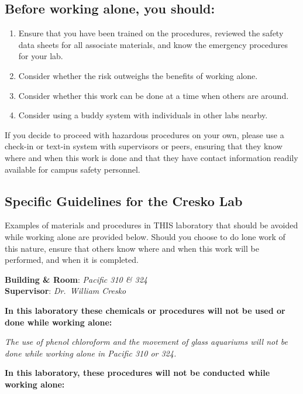 \documentclass[
]{book}
\providecommand{\tightlist}{%
  \setlength{\itemsep}{0pt}\setlength{\parskip}{0pt}}
\begin{document}
\hypertarget{before-working-alone-you-should}{%
\subsection{Before working alone, you should:}\label{before-working-alone-you-should}}

\begin{enumerate}
\def\labelenumi{\arabic{enumi}.}
\tightlist
\item
  Ensure that you have been trained on the procedures, reviewed the safety data sheets for all associate materials, and know the emergency procedures for your lab.
\item
  Consider whether the risk outweighs the benefits of working alone.
\item
  Consider whether this work can be done at a time when others are around.
\item
  Consider using a buddy system with individuals in other labs nearby.
\end{enumerate}

If you decide to proceed with hazardous procedures on your own, please use a check-in or text-in system with supervisors or peers, ensuring that they know where and when this work is done and that they have contact information readily available for campus safety personnel.

\hypertarget{specific-guidelines-for-the-cresko-lab}{%
\subsection{Specific Guidelines for the Cresko Lab}\label{specific-guidelines-for-the-cresko-lab}}

Examples of materials and procedures in THIS laboratory that should be avoided while working alone are provided below. Should you choose to do lone work of this nature, ensure that others know where and when this work will be performed, and when it is completed.

\textbf{Building \& Room}: \emph{Pacific 310 \& 324}\\
\textbf{Supervisor}: \emph{Dr.~William Cresko}

\textbf{In this laboratory these chemicals or procedures will not be used or done while working alone:}

\emph{The use of phenol chloroform and the movement of glass aquariums will not be done while working alone in Pacific 310 or 324.}

\textbf{In this laboratory, these procedures will not be conducted while working alone:}
\end{document}
